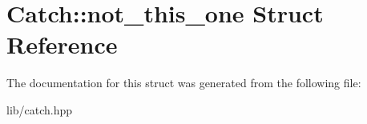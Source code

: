\hypertarget{struct_catch_1_1not__this__one}{}\section{Catch\+:\+:not\+\_\+this\+\_\+one Struct Reference}
\label{struct_catch_1_1not__this__one}


The documentation for this struct was generated from the following file\+:\begin{DoxyCompactItemize}
\item 
lib/catch.\+hpp\end{DoxyCompactItemize}
